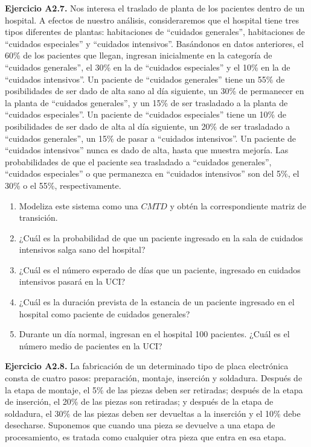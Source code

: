 \documentclass[
]{book}
\providecommand{\tightlist}{%
  \setlength{\itemsep}{0pt}\setlength{\parskip}{0pt}}
\theoremstyle{definition}
\theoremstyle{definition}
\theoremstyle{definition}
\theoremstyle{definition}
\theoremstyle{remark}
\begin{document}
\textbf{Ejercicio A2.7.} Nos interesa el traslado de planta de los pacientes dentro de un hospital. A efectos de nuestro análisis, consideraremos que el hospital tiene tres tipos diferentes de plantas: habitaciones de ``cuidados generales'', habitaciones de ``cuidados especiales'' y ``cuidados intensivos''. Basándonos en datos anteriores, el 60\% de los pacientes que llegan, ingresan inicialmente en la categoría de ``cuidados generales'', el 30\% en la de ``cuidados especiales'' y el 10\% en la de ``cuidados intensivos''. Un paciente de ``cuidados generales'' tiene un 55\% de posibilidades de ser dado de alta sano al día siguiente, un 30\% de permanecer en la planta de ``cuidados generales'', y un 15\% de ser trasladado a la planta de ``cuidados especiales''. Un paciente de ``cuidados especiales'' tiene un 10\% de posibilidades de ser dado de alta al día siguiente, un 20\% de ser trasladado a ``cuidados generales'', un 15\% de pasar a ``cuidados intensivos''. Un paciente de ``cuidados intensivos'' nunca es dado de alta, hasta que muestra mejoría. Las probabilidades de que el paciente sea trasladado a ``cuidados generales'', ``cuidados especiales'' o que permanezca en ``cuidados intensivos'' son del 5\%, el 30\% o el 55\%, respectivamente.

\begin{enumerate}
\def\labelenumi{\arabic{enumi}.}
\tightlist
\item
  Modeliza este sistema como una \(CMTD\) y obtén la correspondiente matriz de transición.
\item
  ¿Cuál es la probabilidad de que un paciente ingresado en la sala de cuidados intensivos salga sano del hospital?
\item
  ¿Cuál es el número esperado de días que un paciente, ingresado en cuidados intensivos pasará en la UCI?
\item
  ¿Cuál es la duración prevista de la estancia de un paciente ingresado en el hospital como paciente de cuidados generales?
\item
  Durante un día normal, ingresan en el hospital 100 pacientes. ¿Cuál es el número medio de pacientes en la UCI?
\end{enumerate}

\textbf{Ejercicio A2.8.} La fabricación de un determinado tipo de placa electrónica consta de cuatro pasos: preparación, montaje, inserción y soldadura. Después de la etapa de montaje, el 5\% de las piezas deben ser retiradas; después de la etapa de inserción, el 20\% de las piezas son retiradas; y después de la etapa de soldadura, el 30\% de las piezas deben ser devueltas a la inserción y el 10\% debe desecharse. Suponemos que cuando una pieza se devuelve a una etapa de procesamiento, es tratada como cualquier otra pieza que entra en esa etapa.
\end{document}
